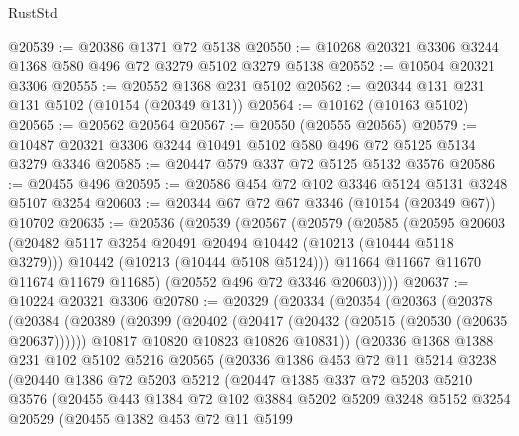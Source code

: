 \begin{lexlean}{RustStd}
\begin{coremodule}
{\begin{coremodule}
{{{{{{{{{{{{{{{{{{{{{{{{{{@20539 := @20386 @1371 @72 @5138
@20550 := @10268 @20321 @3306 @3244 @1368 @580 @496 @72 @3279 @5102 @3279 @5138
@20552 := @10504 @20321 @3306
@20555 := @20552 @1368 @231 @5102
@20562 := @20344 @131 @231 @131 @5102 (@10154 (@20349 @131))
@20564 := @10162 (@10163 @5102)
@20565 := @20562 @20564
@20567 := @20550 (@20555 @20565)
@20579 := @10487 @20321 @3306 @3244 @10491 @5102 @580 @496 @72 @5125 @5134 @3279 @3346
@20585 := @20447 @579 @337 @72 @5125 @5132 @3576
@20586 := @20455 @496
@20595 := @20586 @454 @72 @102 @3346 @5124 @5131 @3248 @5107 @3254
@20603 := @20344 @67 @72 @67 @3346 (@10154 (@20349 @67)) @10702
@20635 := @20536
    (@20539
      (@20567
        (@20579
          (@20585
            (@20595
              @20603
              (@20482 @5117 @3254 @20491 @20494 @10442 (@10213 (@10444 @5118 @3279)))
              @10442
              (@10213 (@10444 @5108 @5124)))
            @11664
            @11667
            @11670
            @11674
            @11679
            @11685)
          (@20552 @496 @72 @3346 @20603))))
@20637 := @10224 @20321 @3306
@20780 := @20329
    (@20334
      (@20354
        (@20363
          (@20378
            (@20384
              (@20389
                (@20399
                  (@20402 (@20417 (@20432 (@20515 (@20530 (@20635 @20637))))))
                  @10817
                  @10820
                  @10823
                  @10826
                  @10831))
              (@20336
                @1368
                @1388
                @231
                @102
                @5102
                @5216
                @20565
                (@20336
                  @1386
                  @453
                  @72
                  @11
                  @5214
                  @3238
                  (@20440
                    @1386
                    @72
                    @5203
                    @5212
                    (@20447
                      @1385
                      @337
                      @72
                      @5203
                      @5210
                      @3576
                      (@20455
                        @443
                        @1384
                        @72
                        @102
                        @3884
                        @5202
                        @5209
                        @3248
                        @5152
                        @3254
                        @20529
                        (@20455
                          @1382
                          @453
                          @72
                          @11
                          @5199
}}}}}}}}}}}}}}}}}}}}}}}}}}
\end{coremodule}}
\end{coremodule}
\end{lexlean}
